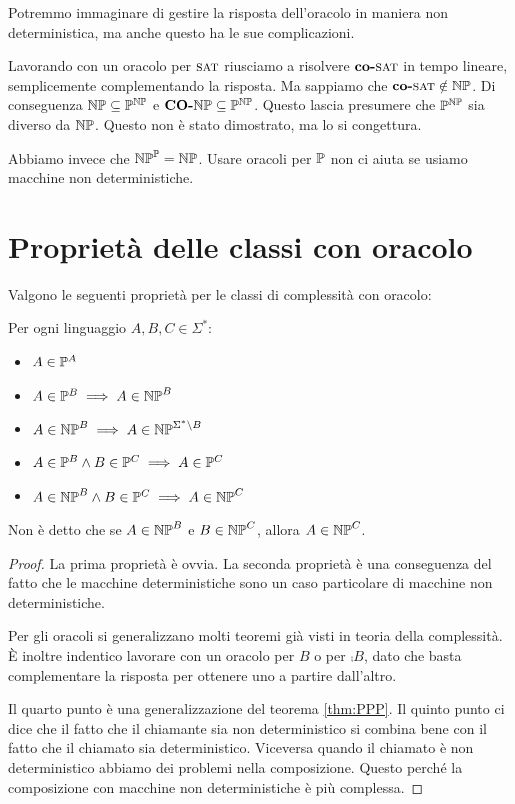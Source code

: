 Potremmo immaginare di gestire la risposta dell'oracolo in maniera non deterministica, ma anche
questo ha le sue complicazioni.

Lavorando con un oracolo per $\textsc{sat}$ riusciamo a risolvere $\textbf{co-}\textsc{sat}$ in tempo lineare, semplicemente
complementando la risposta. Ma sappiamo che $\textbf{co-}\textsc{sat} \notin \mathbb{NP}$. Di conseguenza $\mathbb{NP}
\subseteq \mathbb{P}^{\mathbb{NP}}$ e $\textbf{CO-}\mathbb{NP} \subseteq \mathbb{P}^{\mathbb{NP}}$. Questo lascia presumere che
$\mathbb{P}^{\mathbb{NP}}$ sia diverso da $\mathbb{NP}$. Questo non è stato dimostrato, ma lo si congettura.

Abbiamo invece che $\mathbb{NP}^{\mathbb{P}} = \mathbb{NP}$. Usare oracoli per $\mathbb{P}$ non ci aiuta se
usiamo macchine non deterministiche.

\section{Proprietà delle classi con oracolo}

Valgono le seguenti proprietà per le classi di complessità con oracolo:
\begin{thm}
    Per ogni linguaggio $A,B,C \in \Sigma^{*}$:
    \begin{itemize}
        \item $A \in \mathbb{P}^{A}$
        \item $A \in \mathbb{P}^{B} \implies A \in \mathbb{NP}^{B}$
        \item $A \in \mathbb{NP}^{B} \implies A \in \mathbb{NP}^{\Sigma^{*} \setminus B}$
        \item $A \in \mathbb{P}^{B} \land B \in \mathbb{P}^{C} \implies A \in \mathbb{P}^{C}$
        \item $A \in \mathbb{NP}^{B} \land B \in \mathbb{P}^{C} \implies A \in \mathbb{NP}^{C}$
    \end{itemize}
\end{thm}

Non è detto che se $A \in \mathbb{NP}^{B}$ e $B \in \mathbb{NP}^{C}$, allora $A \in \mathbb{NP}^{C}$.

\begin{proof}
    La prima proprietà è ovvia. La seconda proprietà è una conseguenza del fatto che le macchine
    deterministiche sono un caso particolare di macchine non deterministiche. 

    Per gli oracoli si generalizzano molti teoremi già visti in teoria della complessità. È inoltre
    indentico lavorare con un oracolo per $B$ o per $\comp{B}$, dato che basta complementare la risposta
    per ottenere uno a partire dall'altro. 

    Il quarto punto è una generalizzazione del teorema \ref{thm:PPP}. Il quinto punto ci dice che
    il fatto che il chiamante sia non deterministico si combina bene con il fatto che il chiamato
    sia deterministico. Viceversa quando il chiamato è non deterministico abbiamo dei problemi
    nella composizione. Questo perché la composizione con macchine non deterministiche è più
    complessa. 

\end{proof}

